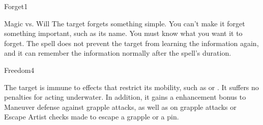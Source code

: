 \begin{spellsection}{Forget}{1}
\begin{spellheader}
\end{spellheader}
\begin{spellcontent}
    \begin{spelltargetinginfo}
    \end{spelltargetinginfo}
    \begin{spelleffects}
        \begin{spellattack}{Magic vs. Will}
            \spelleffect The target forgets something simple. You can't make it forget something important, such as its name. You must know what you want it to forget. The spell does not prevent the target from learning the information again, and it can remember the information normally after the spell's duration.
        \end{spellattack}
        \spelldur \durlong
    \end{spelleffects}
\end{spellcontent}
\begin{spellfooter}
\end{spellfooter}
\end{spellsection}

\begin{spellsection}{Freedom}{4}
\begin{spellheader}
\end{spellheader}
\begin{spellcontent}
    \begin{spelltargetinginfo}
    \end{spelltargetinginfo}
    \begin{spelleffects}
        \spelleffect The target is immune to effects that restrict its mobility, such as  or . It suffers no penalties for acting underwater. In addition, it gains a  enhancement bonus to Maneuver defense against grapple attacks, as well as on grapple attacks or Escape Artist checks made to escape a grapple or a pin.
        \spelldur \durpersonallong
    \end{spelleffects}
\end{spellcontent}
\begin{spellfooter}
\end{spellfooter}
\end{spellsection}

